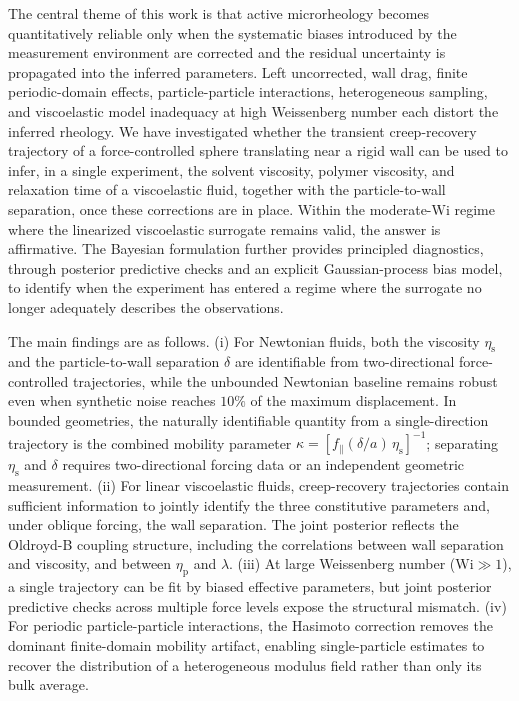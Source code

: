 \documentclass{elsarticle}
\newcommand{\wi}{\mathrm{Wi}}
\begin{document}
The central theme of this work is that active microrheology becomes
quantitatively reliable only when the systematic biases introduced by the
measurement environment are corrected and the residual uncertainty is
propagated into the inferred parameters. Left uncorrected, wall drag,
finite periodic-domain effects, particle-particle interactions,
heterogeneous sampling, and viscoelastic model inadequacy at high
Weissenberg number each distort the inferred rheology. We have
investigated whether the transient creep-recovery trajectory of
a force-controlled sphere translating near a rigid wall can be used to
infer, in a single experiment, the solvent viscosity, polymer viscosity,
and relaxation time of a viscoelastic fluid, together with the
particle-to-wall separation, once these corrections are in place. Within
the moderate-$\wi$ regime where the
linearized viscoelastic surrogate remains valid, the answer is
affirmative. The Bayesian formulation further provides principled
diagnostics, through posterior predictive checks and an explicit
Gaussian-process bias model, to identify when the experiment has entered
a regime where the surrogate no longer adequately describes the
observations.

The main findings are as follows. (i) For Newtonian fluids, both the
viscosity $\eta_{\mathrm{s}}$ and the particle-to-wall separation
$\delta$ are identifiable from two-directional force-controlled
trajectories, while the unbounded Newtonian baseline remains robust even
when synthetic noise reaches $10\%$ of the maximum displacement. In bounded
geometries, the naturally identifiable quantity from a single-direction
trajectory is the combined mobility parameter
$\kappa = [f_{\parallel}(\delta/a)\,\eta_{\mathrm{s}}]^{-1}$;
separating $\eta_{\mathrm{s}}$ and $\delta$ requires two-directional
forcing data or an independent geometric measurement. (ii) For linear
viscoelastic fluids, creep-recovery trajectories contain sufficient
information to jointly identify the three constitutive parameters and,
under oblique forcing, the wall separation. The joint posterior reflects
the Oldroyd-B coupling structure, including the correlations between
wall separation and viscosity, and between $\eta_{\mathrm{p}}$ and
$\lambda$. (iii) At large Weissenberg number ($\wi \gg 1$), a single
trajectory can be fit by biased effective parameters, but joint
posterior predictive checks across multiple force levels expose the
structural mismatch. (iv) For periodic particle-particle interactions,
the Hasimoto correction removes the dominant finite-domain mobility
artifact, enabling single-particle estimates to recover the distribution
of a heterogeneous modulus field rather than only its bulk average.
\end{document}
